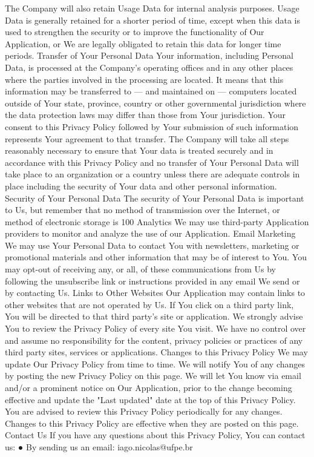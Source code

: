 The Company will also retain Usage Data for internal analysis purposes. Usage Data is generally retained for a shorter period of time, except when this data is used to strengthen the security or to improve the functionality of Our Application, or We are legally obligated to retain this data for longer time periods.
Transfer of Your Personal Data
Your information, including Personal Data, is processed at the Company's operating offices and in any other places where the parties involved in the processing are located. It means that this information may be transferred to — and maintained on — computers located outside of Your state, province, country or other governmental jurisdiction where the data protection laws may differ than those from Your jurisdiction.
Your consent to this Privacy Policy followed by Your submission of such information represents Your agreement to that transfer.
The Company will take all steps reasonably necessary to ensure that Your data is treated securely and in accordance with this Privacy Policy and no transfer of Your Personal Data will take place to an organization or a country unless there are adequate controls in place including the security of Your data and other personal information.
Security of Your Personal Data
The security of Your Personal Data is important to Us, but remember that no method of transmission over the Internet, or method of electronic storage is 100%
Analytics
We may use third-party Application providers to monitor and analyze the use of our Application.
Email Marketing
We may use Your Personal Data to contact You with newsletters, marketing or promotional materials and other information that may be of interest to You. You may opt-out of receiving any, or all, of these communications from Us by following the unsubscribe link or instructions provided in any email We send or by contacting Us.
Links to Other Websites
Our Application may contain links to other websites that are not operated by Us. If You click on a third party link, You will be directed to that third party's site or application. We strongly advise You to review the Privacy Policy of every site You visit.
We have no control over and assume no responsibility for the content, privacy policies or practices of any third party sites, services or applications.
Changes to this Privacy Policy
We may update Our Privacy Policy from time to time. We will notify You of any changes by posting the new Privacy Policy on this page.
We will let You know via email and/or a prominent notice on Our Application, prior to the change becoming effective and update the "Last updated" date at the top of this Privacy Policy.
You are advised to review this Privacy Policy periodically for any changes. Changes to this Privacy Policy are effective when they are posted on this page.
Contact Us
If you have any questions about this Privacy Policy, You can contact us: 
● By sending us an email: iago.nicolas@ufpe.br
